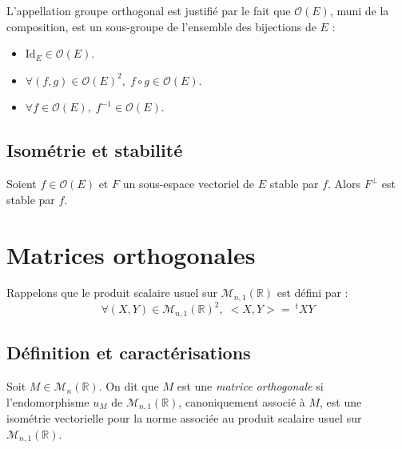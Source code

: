 \documentclass[french,11pt,twoside]{VcCours}
\begin{document}
L'appellation groupe orthogonal est justifié par le fait que $\mathcal{O}(E)$, muni de la composition, est un sous-groupe de l'ensemble des bijections de $E$ :

\begin{Proposition}{} 
\begin{itemize}
\item $\textrm{Id}_E \in \mathcal{O}(E)$.
\item $\forall (f,g) \in \mathcal{O}(E)^2, \; f \circ g \in \mathcal{O}(E)$.
\item $\forall f \in \mathcal{O}(E), \; f^{-1} \in \mathcal{O}(E)$.
\end{itemize}
\end{Proposition}

\begin{Demonstration}{}
\vspace*{6cm}
\end{Demonstration}

\subsection{Isométrie et stabilité}

\begin{Proposition}{} Soient $f \in \mathcal{O}(E)$ et $F$ un sous-espace vectoriel de $E$ stable par $f$. Alors $F^{\perp}$ est stable par $f$.
\end{Proposition}

\begin{Demonstration}{}

\vspace*{5cm}
\end{Demonstration}


\section{Matrices orthogonales}

Rappelons que le produit scalaire usuel sur $\mathcal{M}_{n,1}(\mathbb{R})$ est défini par :
$$ \forall (X,Y) \in \mathcal{M}_{n,1}(\mathbb{R})^2, \; <X,Y> = ~^tX Y$$
\subsection{Définition et caractérisations}

\begin{Definition}{} Soit $M \in \mathcal{M}_n(\mathbb{R})$. On dit que $M$ est une \emph{matrice orthogonale} si l'endomorphisme $u_M$ de $\mathcal{M}_{n,1}(\mathbb{R})$, canoniquement associé à $M$, est une isométrie vectorielle pour la norme associée au produit scalaire usuel sur $\mathcal{M}_{n,1}(\mathbb{R})$.
\end{Definition}
\end{document}
